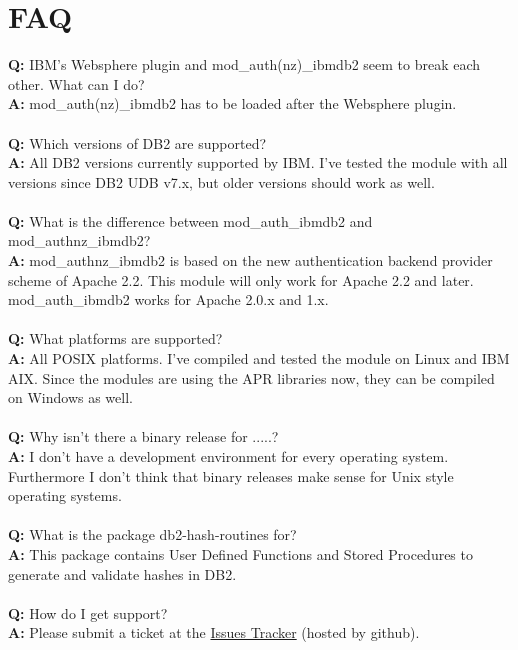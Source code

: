 \section{FAQ}
\textbf{Q:} IBM's Websphere plugin and mod\_auth(nz)\_ibmdb2 seem to break each other. What can I do? \\
\textbf{A:} mod\_auth(nz)\_ibmdb2 has to be loaded after the Websphere plugin. \\
\\
\textbf{Q:} Which versions of DB2 are supported? \\
\textbf{A:} All DB2 versions currently supported by IBM. I've tested the module with all versions since DB2 UDB v7.x, but older versions should work as well. \\
\\
\textbf{Q:} What is the difference between mod\_auth\_ibmdb2 and mod\_authnz\_ibmdb2? \\
\textbf{A:} mod\_authnz\_ibmdb2 is based on the new authentication backend provider scheme of Apache 2.2. This module will only work for Apache 2.2 and later. \linebreak[4] mod\_auth\_ibmdb2 works for Apache 2.0.x and 1.x. \\
\\
\textbf{Q:} What platforms are supported? \\
\textbf{A:} All POSIX platforms. I've compiled and tested the module on Linux and IBM AIX. Since the modules are using the APR libraries now, they can be compiled on Windows as well. \\
\\
\textbf{Q:} Why isn't there a binary release for .....? \\
\textbf{A:} I don't have a development environment for every operating system. Furthermore I don't think that binary releases make sense for Unix style operating systems. \\
\\
\textbf{Q:} What is the package db2-hash-routines for? \\
\textbf{A:} This package contains User Defined Functions and Stored Procedures to generate and validate hashes in DB2. \\
\\
\textbf{Q:} How do I get support? \\
\textbf{A:} Please submit a ticket at the \href{https://github.com/tessus/mod_authnz_ibmdb2/issues}{Issues Tracker} (hosted by github).
